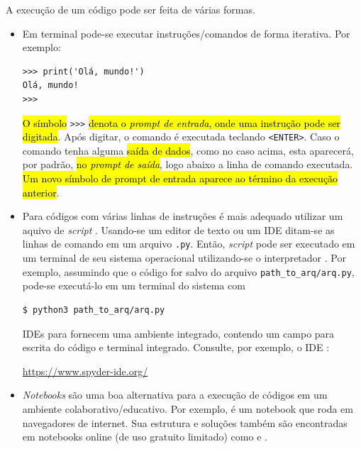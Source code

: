 A execução de um código {\python} pode ser feita de várias formas.

\begin{itemize}
\item {}

  Em terminal {\python} pode-se executar instruções/comandos de forma iterativa. Por exemplo:

\begin{lstlisting}[framexrightmargin=-2.5em]
>>> print('Olá, mundo!')
Olá, mundo!
>>> 
\end{lstlisting}      

  \hl{O símbolo }\lstinline+>>>+\hl{ denota o \emph{prompt de entrada}, onde uma instrução {\python} pode ser digitada}. Após digitar, o comando é executada teclando \lstinline+<ENTER>+. Caso o comando tenha alguma \hl{saída de dados}, como no caso acima, esta aparecerá, por padrão, \hl{no \emph{prompt de saída}}, logo abaixo a linha de comando executada. \hl{Um novo símbolo de prompt de entrada aparece ao término da execução anterior}.

\item {}

  Para códigos com várias linhas de instruções é mais adequado utilizar um aquivo de \textit{script} {\python}. Usando-se um editor de texto ou um IDE ditam-se as linhas de comando em um arquivo \lstinline+.py+. Então, \textit{script} pode ser executado em um terminal de seu sistema operacional utilizando-se o interpretador {\python}. Por exemplo, assumindo que o código for salvo do arquivo \lstinline+path_to_arq/arq.py+, pode-se executá-lo em um terminal do sistema com

\begin{lstlisting}[framexrightmargin=-2.5em]
$ python3 path_to_arq/arq.py 
\end{lstlisting}%
  

  IDEs para {\python} fornecem uma ambiente integrado, contendo um campo para escrita do código e terminal {\python} integrado. Consulte, por exemplo, o IDE {\spyder}:
  \begin{center}
    \url{https://www.spyder-ide.org/}
  \end{center}

\item {}

  \textit{Notebooks} {\python} são uma boa alternativa para a execução de códigos em um ambiente colaborativo/educativo. Por exemplo, {\jupyter} é um notebook que roda em navegadores de internet. Sua estrutura e soluções também são encontradas em notebooks online (de uso gratuito limitado) como {\colab} e {\kaggle}.  
\end{itemize}

